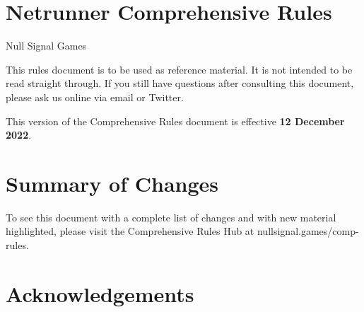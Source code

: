 \documentclass{article}
\newcommand{\subtitle}[1]{{\Large #1 \vspace{2ex}}}
\begin{document}

\section*{Netrunner Comprehensive Rules}
\subtitle{Null Signal Games}

\noindent
This rules document is to be used as reference material. It is not intended to be read straight through. If you still have questions after consulting this document, please ask us online via email or Twitter.

\noindent
This version of the Comprehensive Rules document is effective \textbf{12 December 2022}.

\section*{Summary of Changes}

\noindent
To see this document with a complete list of changes and with new material highlighted, please visit the Comprehensive Rules Hub at \textlangle{}nullsignal.games/comp-rules\textrangle.

\begin{outline}[enumerate]
\end{outline}


\newpage


\begin{multicols}{2}
  \tableofcontents
\end{multicols}


\newpage




\newpage

\section*{Acknowledgements}
\end{document}
